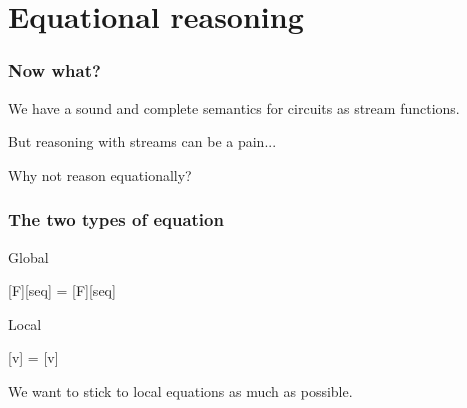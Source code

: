 \section{Equational reasoning}

\begin{frame}
    \frametitle{Now what?}

    We have a \alert{sound and complete} semantics for circuits as
    \alert{stream functions}.

    \wait

    But reasoning with streams can be a \alert{pain}...

    \wait
    Why not reason \alert{equationally}?
\end{frame}
\begin{frame}
    \frametitle{The two types of equation}

    \centering
    \begin{minipage}{0.49\textwidth}
        \centering
        \alert{Global}

        \vspace{1.5em}

        [F][seq]
        =
        [F][seq]
    \end{minipage}
    \begin{minipage}{0.49\textwidth}
        \centering
        \alert{Local}

        \vspace{1.5em}

        [v]
        =
        [v]
    \end{minipage}

    \vspace{1.5em}

    We want to stick to local equations \alert{as much as possible}.

\end{frame}

